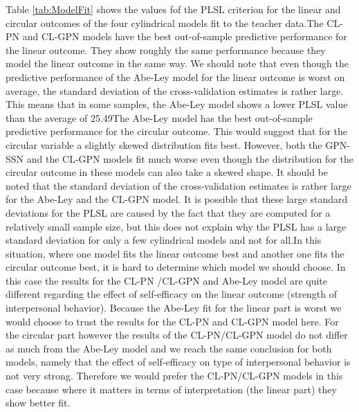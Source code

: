\documentclass[man]{apa6}
\theoremstyle{definition}
\theoremstyle{definition}
\theoremstyle{definition}
\theoremstyle{remark}
\begin{document}
Table \ref{tab:ModelFit} shows the values fof the PLSL criterion for the
linear and circular outcomes of the four cylindrical models fit to the
teacher data.\newline \indent The CL-PN and CL-GPN models have the best
out-of-sample predictive performance for the linear outcome. They show
roughly the same performance because they model the linear outcome in
the same way. We should note that even though the predictive performance
of the Abe-Ley model for the linear outcome is worst on average, the
standard deviation of the cross-validation estimates is rather large.
This means that in some samples, the Abe-Ley model shows a lower PLSL
value than the average of 25.49\newline \indent The Abe-Ley model has
the best out-of-sample predictive performance for the circular outcome.
This would suggest that for the circular variable a slightly skewed
distribution fits best. However, both the GPN-SSN and the CL-GPN models
fit much worse even though the distribution for the circular outcome in
these models can also take a skewed shape. It should be noted that the
standard deviation of the cross-validation estimates is rather large for
the Abe-Ley and the CL-GPN model. It is possible that these large
standard deviations for the PLSL are caused by the fact that they are
computed for a relatively small sample size, but this does not explain
why the PLSL has a large standard deviation for only a few cylindrical
models and not for all.\newline \indent In this situation, where one
model fits the linear outcome best and another one fits the circular
outcome best, it is hard to determine which model we should choose. In
this case the results for the CL-PN /CL-GPN and Abe-Ley model are quite
different regarding the effect of self-efficacy on the linear outcome
(strength of interpersonal behavior). Because the Abe-Ley fit for the
linear part is worst we would choose to trust the results for the CL-PN
and CL-GPN model here. For the circular part however the results of the
CL-PN/CL-GPN model do not differ as much from the Abe-Ley model and we
reach the same conclusion for both models, namely that the effect of
self-efficacy on type of interpersonal behavior is not very strong.
Therefore we would prefer the CL-PN/CL-GPN models in this case because
where it matters in terms of interpretation (the linear part) they show
better fit.
\end{document}
